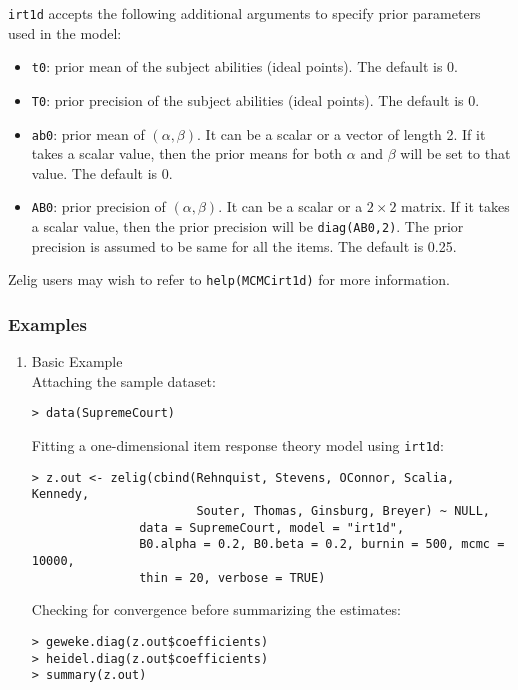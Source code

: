 \noindent \texttt{irt1d} accepts the following additional arguments to 
specify prior parameters used in the model:

\begin{itemize}

\item \texttt{t0}: prior mean of the subject abilities
(ideal points). The default is 0.

\item \texttt{T0}: prior precision of the subject abilities
(ideal points). The default is 0.

\item \texttt{ab0}: prior mean of $(\alpha, \beta)$. It can be a scalar or
a vector of length 2. If it takes a scalar value, then the prior means for
both $\alpha$ and $\beta$ will be set to that value. The default is 0. 

\item \texttt{AB0}: prior precision of $(\alpha, \beta)$. It can be 
a scalar or a $2 \times 2$ matrix. If it takes a scalar value, 
then the prior precision will be \texttt{diag(AB0,2)}. The prior precision
is assumed to be same for all the items. The default is 0.25.

\end{itemize}

Zelig users may wish to refer to \texttt{help(MCMCirt1d)} for more 
information.



\subsubsection{Examples}

\begin{enumerate}
\item {Basic Example} \\
Attaching the sample dataset:
\begin{verbatim}
> data(SupremeCourt)
\end{verbatim}
Fitting a one-dimensional item response theory model using \texttt{irt1d}:
\begin{verbatim}
> z.out <- zelig(cbind(Rehnquist, Stevens, OConnor, Scalia, Kennedy,
                       Souter, Thomas, Ginsburg, Breyer) ~ NULL,
               data = SupremeCourt, model = "irt1d",
               B0.alpha = 0.2, B0.beta = 0.2, burnin = 500, mcmc = 10000,
               thin = 20, verbose = TRUE)
\end{verbatim}

Checking for convergence before summarizing the estimates:
\begin{verbatim}
> geweke.diag(z.out$coefficients)
> heidel.diag(z.out$coefficients)
> summary(z.out)
\end{verbatim}
\end{enumerate}

